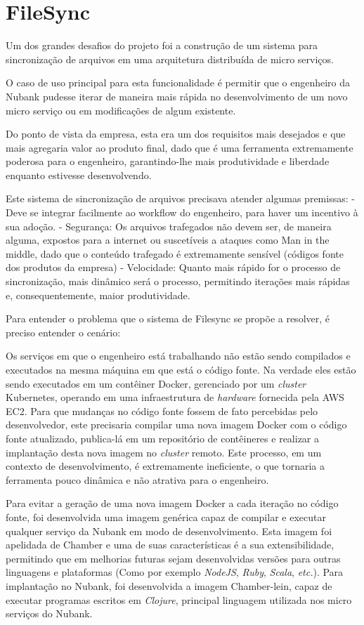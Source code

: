 \documentclass[]{politex}
\begin{document}
	\section{FileSync}

	Um dos grandes desafios do projeto foi a construção de um sistema para sincronização de arquivos em uma arquitetura distribuída de micro serviços.
	
	O caso de uso principal para esta funcionalidade é permitir que o engenheiro da Nubank pudesse iterar de maneira mais rápida no desenvolvimento de um novo micro serviço ou em modificações de algum existente.
	
	Do ponto de vista da empresa, esta era um dos requisitos mais desejados e que mais agregaria valor ao produto final, dado que é uma ferramenta extremamente poderosa para o engenheiro, garantindo-lhe mais produtividade e liberdade enquanto estivesse desenvolvendo.
	
	Este sistema de sincronização de arquivos precisava atender algumas premissas:
	- Deve se integrar facilmente ao workflow do engenheiro, para haver um incentivo à sua adoção.
	- Segurança: Os arquivos trafegados não devem ser, de maneira alguma, expostos para a internet ou suscetíveis a ataques como Man in the middle, dado que o conteúdo trafegado é extremamente sensível (códigos fonte dos produtos da empresa)
	- Velocidade: Quanto mais rápido for o processo de sincronização, mais dinâmico será o processo, permitindo iterações mais rápidas e, consequentemente, maior produtividade.

	Para entender o problema que o sistema de Filesync se propõe a resolver, é preciso entender o cenário:
	
	Os serviços em que o engenheiro está trabalhando não estão sendo compilados e executados na mesma máquina em que está o código fonte. Na verdade eles estão sendo executados em um contêiner Docker, gerenciado por um \textit{cluster} Kubernetes, operando em uma infraestrutura de \textit{hardware} fornecida pela AWS EC2. Para que mudanças no código fonte fossem de fato percebidas pelo desenvolvedor, este precisaria compilar uma nova imagem Docker com o código fonte atualizado, publica-lá em um repositório de contêineres e realizar a implantação desta nova imagem no \textit{cluster} remoto. Este processo, em um contexto de desenvolvimento, é extremamente ineficiente, o que tornaria a ferramenta pouco dinâmica e não atrativa para o engenheiro.

	Para evitar a geração de uma nova imagem Docker a cada iteração no código fonte, foi desenvolvida uma imagem genérica capaz de compilar e executar qualquer serviço da Nubank em modo de desenvolvimento. Esta imagem foi apelidada de Chamber e uma de suas características é a sua extensibilidade, permitindo que em melhorias futuras sejam desenvolvidas versões para outras linguagens e plataformas (Como por exemplo \textit{NodeJS}, \textit{Ruby}, \textit{Scala}, \textit{etc.}). Para implantação no Nubank, foi desenvolvida a imagem Chamber-lein, capaz de executar programas escritos em \textit{Clojure}, principal linguagem utilizada nos micro serviços do Nubank.
	
\end{document}
